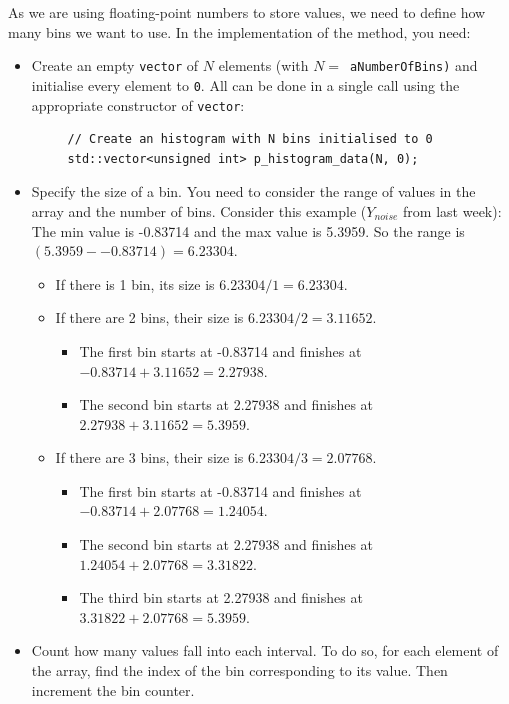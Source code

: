 \documentclass[english,a4paper,12pt,oneside]{article}
\begin{document}
As we are using floating-point numbers to store values, we need to define how many bins we want to use. 
In the implementation of the method, you need:
\begin{itemize}
 \item Create an empty \verb+vector+ of $N$ elements (with $N=$~\verb+aNumberOfBins)+ and initialise every element to \verb+0+. All can be done in a single call using the appropriate constructor of \verb+vector+:
 
  \begin{lstlisting}
     // Create an histogram with N bins initialised to 0
     std::vector<unsigned int> p_histogram_data(N, 0);
  \end{lstlisting}

 
 \item Specify the size of a bin. You need to consider the range of values in the array and the number of bins. 
Consider this example ($Y_{noise}$ from last week): The min value is -0.83714 and the max value is 5.3959. So the range is $(5.3959 - -0.83714) = 6.23304$. 
\begin{itemize}
    \item If there is 1 bin, its size is $6.23304 / 1 = 6.23304$.
    \item If there are 2 bins, their size is $6.23304 / 2 = 3.11652$. 
    \begin{itemize}
    	\item The first bin starts at -0.83714 and finishes at $-0.83714 + 3.11652 = 2.27938$.
    	\item The second bin starts at 2.27938 and finishes at $2.27938 + 3.11652 = 5.3959$.
    \end{itemize}
    \item If there are 3 bins, their size is $6.23304 / 3 = 2.07768$. 
    \begin{itemize}
    	\item The first bin starts at -0.83714 and finishes at $-0.83714 + 2.07768 = 1.24054$.
    	\item The second bin starts at 2.27938 and finishes at $1.24054 + 2.07768 = 3.31822$.
    	\item The third bin starts at 2.27938 and finishes at $3.31822 + 2.07768 = 5.3959$.
    \end{itemize}
\end{itemize}
 
 
 \item Count how many values fall into each interval. To do so, for each element of the array, find the index of the bin corresponding to its value. Then increment the bin counter.
\end{itemize}
\end{document}
